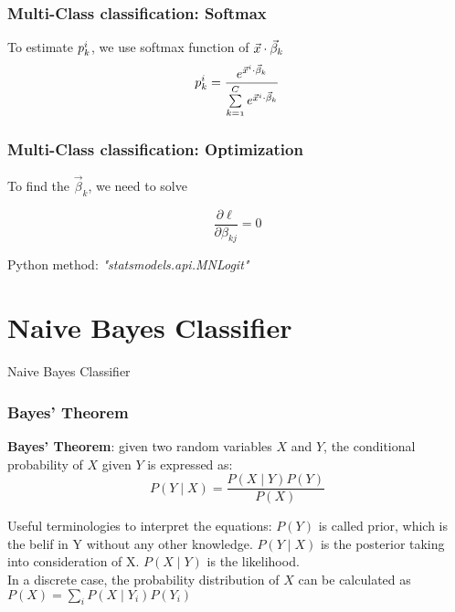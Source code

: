 \documentclass[notheorems, aspectratio=54]{beamer}
\def\parchmentframe#1{
\tikz{
  \node[inner sep=2em] (A) {#1};  %
  \begin{pgfonlayer}{background}  %
  \fill[normal border] 
        (A.south east) -- (A.south west) -- 
        (A.north west) -- (A.north east) -- cycle;
  \end{pgfonlayer}}}
\def\parchmentframetop#1{
\tikz{
  \node[inner sep=2em] (A) {#1};    %
  \begin{pgfonlayer}{background}    
  \fill[normal border]              %
        (A.south east) -- (A.south west) -- 
        (A.north west) -- (A.north east) -- cycle;
  \fill[torn border]                %
        ($(A.south east)-(0,.2)$) -- ($(A.south west)-(0,.2)$) -- 
        ($(A.south west)+(0,.2)$) -- ($(A.south east)+(0,.2)$) -- cycle;
  \end{pgfonlayer}}}
\def\parchmentframebottom#1{
\tikz{
  \node[inner sep=2em] (A) {#1};   %
  \begin{pgfonlayer}{background}   
  \fill[normal border]             %
        (A.south east) -- (A.south west) -- 
        (A.north west) -- (A.north east) -- cycle;
  \fill[torn border]               %
        ($(A.north east)-(0,.2)$) -- ($(A.north west)-(0,.2)$) -- 
        ($(A.north west)+(0,.2)$) -- ($(A.north east)+(0,.2)$) -- cycle;
  \end{pgfonlayer}}}
\def\parchmentframemiddle#1{
\tikz{
  \node[inner sep=2em] (A) {#1};   %
  \begin{pgfonlayer}{background}   
  \fill[normal border]             %
        (A.south east) -- (A.south west) -- 
        (A.north west) -- (A.north east) -- cycle;
  \fill[torn border]               %
        ($(A.south east)-(0,.2)$) -- ($(A.south west)-(0,.2)$) -- 
        ($(A.south west)+(0,.2)$) -- ($(A.south east)+(0,.2)$) -- cycle;
  \fill[torn border]               %
        ($(A.north east)-(0,.2)$) -- ($(A.north west)-(0,.2)$) -- 
        ($(A.north west)+(0,.2)$) -- ($(A.north east)+(0,.2)$) -- cycle;
  \end{pgfonlayer}}}
\newenvironment{parchment}[1][Example]{%
  \def\FrameCommand{\parchmentframe}%
  \def\FirstFrameCommand{\parchmentframetop}%
  \def\LastFrameCommand{\parchmentframebottom}%
  \def\MidFrameCommand{\parchmentframemiddle}%
  \vskip\baselineskip
  \MakeFramed {\FrameRestore}
  \noindent\tikz\node[inner sep=1ex, draw=black!20,fill=white, 
          anchor=west, overlay] at (0em, 2em) {\sffamily#1};\par}%
{\endMakeFramed}
\begin{document}
\begin{frame}
\frametitle{Multi-Class classification: Softmax }
To estimate $\mathnormal{p^i_k}$, we use softmax function of $\mathnormal{\vec{x} \cdot \vec{\beta}_k}$
$$\mathnormal{p^i_k=\frac{e^{\vec{x}^i \cdot \vec{\beta}_k}}{\sum\limits_{k=1}^C e^{\vec{x}^i \cdot \vec{\beta}_k}}}$$
\end{frame}

\begin{frame}
\frametitle{Multi-Class classification: Optimization }
To find the $\vec{\beta}_k$, we need to solve 

$$\frac{\partial{\ell}}{\partial \beta_{kj}}=0$$

Python method: \textit{"statsmodels.api.MNLogit"}
\end{frame}



\section{Naive Bayes Classifier}

\begin{frame}
\begin{center}
Naive Bayes Classifier
\end{center}
\end{frame}

\begin{frame}
\frametitle{Bayes' Theorem}
\textbf{Bayes' Theorem}: given two random variables $X$ and $Y$, the conditional probability of $X$ given $Y$ is expressed as:
$$P(Y\mid X)=\frac {P(X\mid Y)P(Y)}{P(X)}$$

Useful terminologies to interpret the equations: $P(Y)$ is called prior, which is the belif in Y without any other knowledge. $P(Y\mid X)$ is the posterior taking into consideration of X. $P(X\mid Y)$ is the likelihood.\\
\vspace{0.5cm}
In a discrete case, the probability distribution of $X$ can be calculated as
$P(X)=\sum _{i}P(X\mid Y_{i})P(Y_{i})$

\end{frame}

\end{document}
